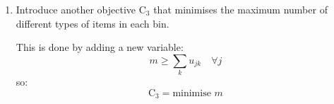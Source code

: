 \documentclass[10pt,a4paper]{article}
\begin{document}
\begin{enumerate}
\item 
Introduce another objective \(\text{C}_3\) that minimises the maximum number of different types of items in each bin.

This is done by adding a new variable:
\begin{equation*}
	m \geq \sum_k u_{jk} \quad \forall j
\end{equation*}
so:
\begin{equation*}
\text{C}_3 = \text{minimise } m
\end{equation*}
\end{enumerate}
\end{document}
